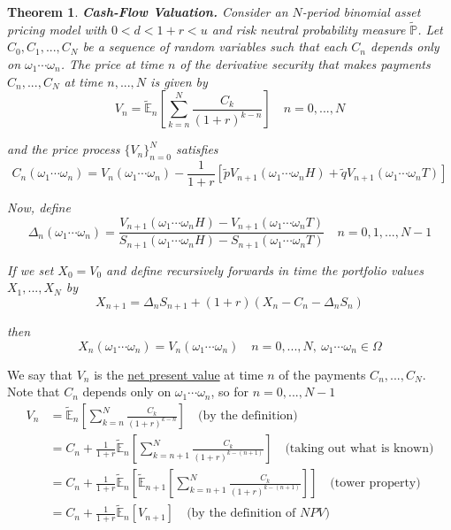 \documentclass[12pt]{article}
\newtheorem{theorem}{Theorem}
\newlength\tindent
\renewcommand{\indent}{\hspace*{\tindent}}
\renewcommand{\P}{\mathbb P}
\newcommand{\E}{\mathbb E}
\begin{document}
\begin{theorem}{\bf Cash-Flow Valuation.} Consider an $N$-period binomial asset pricing model with $0 < d < 1 + r < u$ and risk neutral probability measure $\tilde{\P}$. Let $C_0, C_1, ..., C_N$ be a sequence of random variables such that each $C_n$ depends only on $\omega_1\cdots\omega_n$. The price at time $n$ of the derivative security that makes payments $C_n,...,C_N$ at time $n,..., N$ is given by
\begin{equation*}
	V_n = \tilde{\E}_n \left[ \sum^N_{k = n}  \frac{C_k}{(1 + r)^{k - n}}  \right] \quad n = 0,..., N
\end{equation*}

and the price process $\{V_n\}^N_{n = 0}$ satisfies
\begin{equation*}
	C_n(\omega_1\cdots\omega_n) = V_n(\omega_1\cdots\omega_n) - \frac{1}{1 + r} \left[ \tilde{p}V_{n + 1}(\omega_1\cdots\omega_n H) + \tilde{q}V_{n + 1}(\omega_1\cdots\omega_n T) \right]
\end{equation*}

Now, define
\begin{equation*}
	\Delta_n(\omega_1\cdots\omega_n) = \frac{V_{n + 1}(\omega_1\cdots\omega_n H)  - V_{n + 1}(\omega_1\cdots\omega_n T)}{ S_{n + 1}(\omega_1\cdots\omega_n H) - S_{n + 1}(\omega_1\cdots\omega_n T) } \quad n = 0, 1, ..., N - 1
\end{equation*}

If we set $X_0 = V_0$ and define recursively forwards in time the portfolio values $X_1, ..., X_N$ by
\begin{equation*}
	X_{n + 1} = \Delta_n S_{n + 1} + (1 + r)(X_n - C_n - \Delta_n S_n)
\end{equation*}

then
\begin{equation*}
	X_n(\omega_1\cdots\omega_n) = V_n(\omega_1\cdots\omega_n) \quad n = 0, ..., N,~\omega_1\cdots\omega_n \in \Omega
\end{equation*}
\end{theorem}

\indent We say that $V_n$ is the \underline{net present value} at time $n$ of the payments $C_n, ..., C_N$. Note that $C_n$ depends only on $\omega_1\cdots\omega_n$, so for $n = 0,..., N - 1$
\begin{align*}
	V_n &= \tilde{\E}_n \left[ \sum^N_{k = n} \frac{C_k}{(1 + r)^{k - n}}  \right] \quad \text{(by the definition)} \\
	&= C_n + \frac{1}{1 + r} \tilde{\E}_n \left[ \sum^N_{k = n + 1} \frac{C_k}{(1 + r)^{k - (n + 1)} }\right] \quad \text{(taking out what is known)} \\
	&= C_n + \frac{1}{1 + r} \tilde{\E}_n \left[ \tilde{\E}_{n + 1} \left[ \sum^N_{k = n + 1} \frac{C_k}{(1 + r)^{k - (n + 1)} }\right] \right] \quad \text{(tower property)} \\
	&= C_n + \frac{1}{1 + r} \tilde{\E}_n \left[  V_{n + 1} \right] \quad \text{(by the definition of $NPV$)}
\end{align*}
\end{document}
